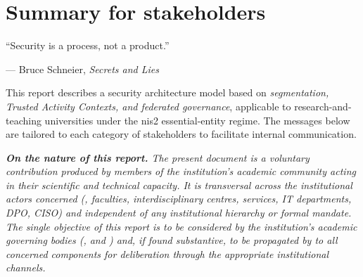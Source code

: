 \section{Summary for stakeholders}
\label{sec:stakeholders}

\epigraph{``Security is a process, not a product.''}{--- Bruce Schneier, \textit{Secrets and Lies}~\cite{schneier2000}}

This report describes a security architecture model based on
\emph{segmentation, Trusted Activity Contexts, and federated
governance}, applicable to research-and-teaching universities under
the \gls{nis2} essential-entity regime. The messages below are
tailored to each category of stakeholders to facilitate internal
communication.

\begin{tcolorbox}[colback=Slate!4!white, colframe=Slate!60!black,
  sharp corners=south, boxrule=0.5pt, breakable,
  left=6pt, right=6pt, top=5pt, bottom=5pt]
\textit{\textbf{On the nature of this report.} The present
document is a voluntary contribution produced by members of the
institution's academic community acting in
their scientific and technical capacity. It is transversal across
the institutional actors concerned (, faculties,
interdisciplinary centres, services, IT departments, DPO, CISO)
and independent of any institutional hierarchy or formal mandate.
The single objective of this report is to be considered by the
institution's academic governing bodies (, and
) and, if found substantive, to
be propagated by  to all concerned components
for deliberation through the appropriate institutional channels.}
\end{tcolorbox}

